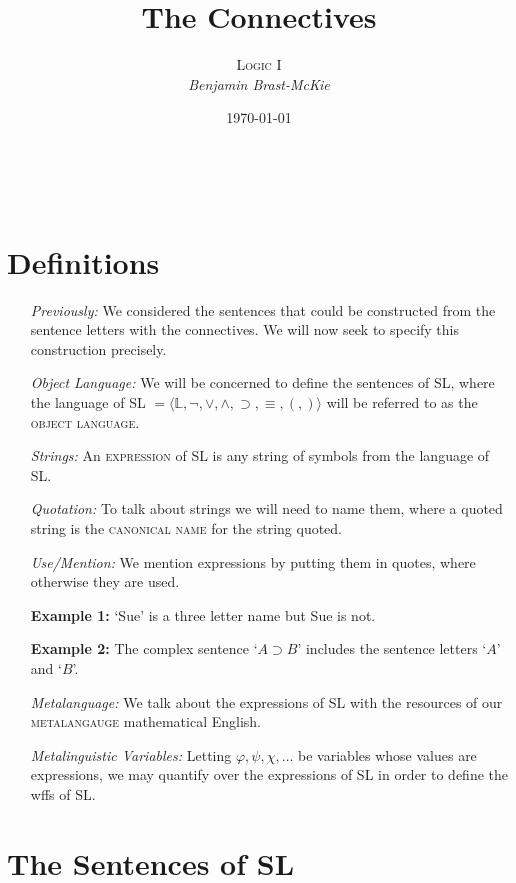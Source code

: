 \documentclass[a4paper, 11pt]{article} %
\title{\textbf{The Connectives}} %
\author{\textsc{Logic I}\\ \em Benjamin Brast-McKie} %
\date{\today} %
\makeatletter
\newcommand{\tuple}[1]{\langle#1\rangle} %
\renewcommand{\maketitle}{ %
\begin{flushright} %
{\LARGE\@title} %

\vspace{10pt} %

{\@author} %
\\\@date %

\vspace{-10pt} %
\end{flushright}
}
\makeatother
\begin{document}
\maketitle %

\thispagestyle{empty}


\section*{Definitions}

\begin{enumerate}[leftmargin=1.5in,labelsep=.15in] %
  \item[\it Previously:] We considered the sentences that could be constructed from the sentence letters with the connectives. We will now seek to specify this construction precisely.
  \item[\it Object Language:] We will be concerned to define the sentences of SL, where the language of SL $=\tuple{\mathbb{L},\neg,\vee,\wedge,\supset,\equiv,(,)}$ will be referred to as the \textsc{object language}.
  \item[\it Strings:] An \textsc{expression} of SL is any string of symbols from the language of SL.
  \item[\it Quotation:] To talk about strings we will need to name them, where a quoted string is the \textsc{canonical name} for the string quoted.
  \item[\it Use/Mention:] We mention expressions by putting them in quotes, where otherwise they are used.
  \item[\bf Example 1:] `Sue' is a three letter name but Sue is not.
  \item[\bf Example 2:] The complex sentence `$A \supset B$' includes the sentence letters `$A$' and `$B$'.
  \item[\it Metalanguage:] We talk about the expressions of SL with the resources of our \textsc{metalangauge} mathematical English.
  \item[\it Metalinguistic Variables:] Letting $\varphi,\psi,\chi,\ldots$ be variables whose values are expressions, we may quantify over the expressions of SL in order to define the wffs of SL.
\end{enumerate}




\section*{The Sentences of SL}
\end{document}
